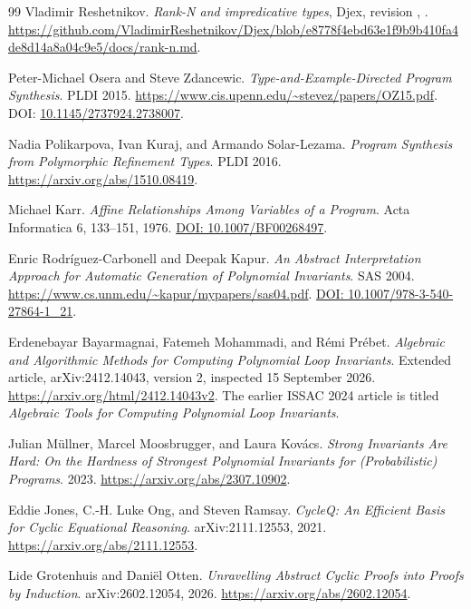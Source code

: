 \begin{thebibliography}{99}
 Vladimir Reshetnikov.
\emph{Rank-N and impredicative types}, Djex,
revision ,
.
\url{https://github.com/VladimirReshetnikov/Djex/blob/e8778f4ebd63e1f9b9b410fa4de8d14a8a04c9e5/docs/rank-n.md}.

 Peter-Michael Osera and Steve Zdancewic.
\emph{Type-and-Example-Directed Program Synthesis}. PLDI 2015.
\url{https://www.cis.upenn.edu/~stevez/papers/OZ15.pdf}.
DOI: \href{https://doi.org/10.1145/2737924.2738007}{10.1145/2737924.2738007}.

 Nadia Polikarpova, Ivan Kuraj, and Armando Solar-Lezama.
\emph{Program Synthesis from Polymorphic Refinement Types}. PLDI 2016.
\url{https://arxiv.org/abs/1510.08419}.

 Michael Karr.
\emph{Affine Relationships Among Variables of a Program}.
Acta Informatica 6, 133--151, 1976.
\href{https://doi.org/10.1007/BF00268497}{DOI: 10.1007/BF00268497}.

 Enric Rodr\'iguez-Carbonell and Deepak Kapur.
\emph{An Abstract Interpretation Approach for Automatic Generation of Polynomial Invariants}.
SAS 2004. \url{https://www.cs.unm.edu/~kapur/mypapers/sas04.pdf}.
\href{https://doi.org/10.1007/978-3-540-27864-1_21}{DOI: 10.1007/978-3-540-27864-1\_21}.

 Erdenebayar Bayarmagnai, Fatemeh Mohammadi, and R\'emi Pr\'ebet.
\emph{Algebraic and Algorithmic Methods for Computing Polynomial Loop Invariants}.
Extended article, arXiv:2412.14043, version 2, inspected 15 September 2026.
\url{https://arxiv.org/html/2412.14043v2}.
The earlier ISSAC 2024 article is titled
\emph{Algebraic Tools for Computing Polynomial Loop Invariants}.

 Julian M\"ullner, Marcel Moosbrugger, and Laura Kov\'acs.
\emph{Strong Invariants Are Hard: On the Hardness of Strongest Polynomial
Invariants for (Probabilistic) Programs}. 2023.
\url{https://arxiv.org/abs/2307.10902}.

 Eddie Jones, C.-H. Luke Ong, and Steven Ramsay.
\emph{CycleQ: An Efficient Basis for Cyclic Equational Reasoning}.
arXiv:2111.12553, 2021.
\url{https://arxiv.org/abs/2111.12553}.

 Lide Grotenhuis and Dani\"el Otten.
\emph{Unravelling Abstract Cyclic Proofs into Proofs by Induction}.
arXiv:2602.12054, 2026.
\url{https://arxiv.org/abs/2602.12054}.


\end{thebibliography}
